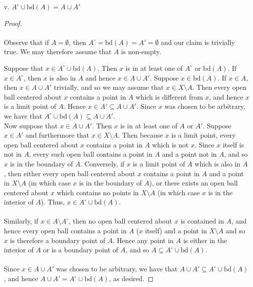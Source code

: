 \pagebreak


v. $A^{\circ} \cup \text{bd}(A) = A \cup A'$ \ \\
    
\begin{proof}\ \\\\
    Observe that if $A = \emptyset$, then $A^\circ = \text{bd}(A) = A' = \emptyset$ and our claim is trivially true. We 
    may therefore assume that $A$ is non-empty.

    Suppose that $x \in A^\circ \cup \text{bd}(A)$. Then $x$ is in at least one of $A^\circ$ or 
    $\text{bd}(A)$. If $x \in A^\circ$, then $x$ is also in $A$ and hence $x \in A \cup A'$.  Suppose 
    $x \in \text{bd}(A)$. If $x \in A$, then $x \in A \cup A'$ trivially, and so we may assume that 
    $x \in X \setminus A$. Then every open ball centered about $x$ contains a point in $A$ which is different from $x$, 
    and hence $x$ is a limit point of $A$. Hence $x \in A' \subseteq A \cup A'$. Since $x$ was chosen to be arbitrary, 
    we have that $A^\circ \cup \text{bd}(A) \subseteq A \cup A'$.
    \ \\
    Now suppose that $x \in A \cup A'$. Then $x$ is in at least one of $A$ or $A'$. Suppose $x \in A'$ and furthermore
    that $x \in X \setminus A$. Then because $x$ is a limit point, every open ball centered about $x$ contains a point
    in $A$ which is not $x$. Since $x$ itself is not in $A$, every such open ball contains a point in $A$ and a 
    point not in $A$, and so $x$ is in the boundary of $A$. Conversely, if $x$ is
    a limit point of $A$ which is also in $A$, then either every open ball centered about $x$ contains a point in $A$
    and a point in $X \setminus A$ (in which case $x$ is in the boundary of $A$), or there exists an open ball centered 
    about $x$ which contains no points in $X \setminus A$ (in which case $x$ is in the interior of $A$). Thus, 
    $x \in A^\circ \cup \text{bd}(A)$. 
    \ \\\\
    Similarly, if $x \in A \setminus A^\circ$, then no open ball centered about $x$ is
    contained in $A$, and hence every open ball contains a point in $A$ ($x$ itself) and a point in $X \setminus A$ and
    so $x$ is therefore a boundary point of $A$. Hence any point in $A$ is either in the interior of $A$ or is a
    boundary point of $A$, and so $A \subseteq A^\circ \cup \text{bd}(A)$.
    \ \\\\
    Since $x \in A \cup A'$ was chosen to be arbitrary, we have that $A \cup A' \subseteq A^\circ \cup \text{bd}(A)$, 
    and hence $A \cup A' = A^\circ \cup \text{bd}(A)$, as desired.
\end{proof}

